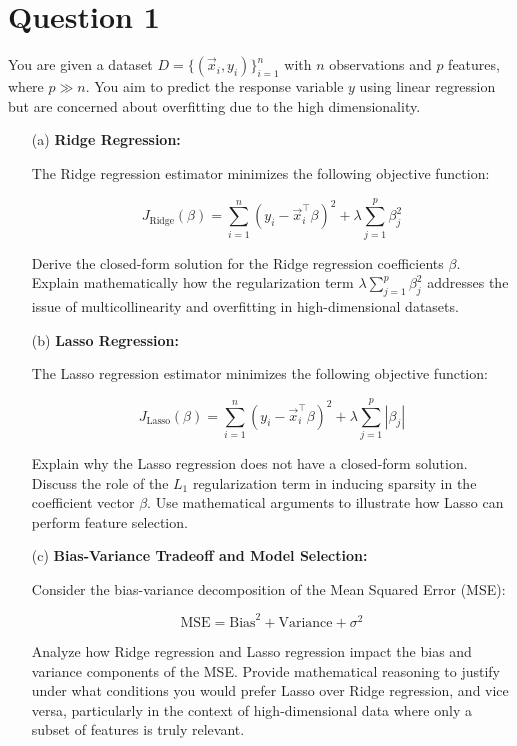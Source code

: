 \documentclass{article}
\begin{document}
\section*{Question 1}

You are given a dataset \( D = \{ (\vec{x}_i, y_i) \}_{i=1}^n \) with \( n \) observations and \( p \) features, where \( p \gg n \). You aim to predict the response variable \( y \) using linear regression but are concerned about overfitting due to the high dimensionality.

\begin{enumerate}
    \item[(a)] \textbf{Ridge Regression:}
    
    The Ridge regression estimator minimizes the following objective function:
    
    \[
    J_{\text{Ridge}}(\beta) = \sum_{i=1}^n (y_i - \vec{x}_i^\top \beta)^2 + \lambda \sum_{j=1}^p \beta_j^2
    \]
    
    Derive the closed-form solution for the Ridge regression coefficients \( \beta \). Explain mathematically how the regularization term \( \lambda \sum_{j=1}^p \beta_j^2 \) addresses the issue of multicollinearity and overfitting in high-dimensional datasets.
    
    \item[(b)] \textbf{Lasso Regression:}
    
    The Lasso regression estimator minimizes the following objective function:
    
    \[
    J_{\text{Lasso}}(\beta) = \sum_{i=1}^n (y_i - \vec{x}_i^\top \beta)^2 + \lambda \sum_{j=1}^p |\beta_j|
    \]
    
    Explain why the Lasso regression does not have a closed-form solution. Discuss the role of the \( L_1 \) regularization term in inducing sparsity in the coefficient vector \( \beta \). Use mathematical arguments to illustrate how Lasso can perform feature selection.
    
    \item[(c)] \textbf{Bias-Variance Tradeoff and Model Selection:}
    
    Consider the bias-variance decomposition of the Mean Squared Error (MSE):
    
    \[
    \text{MSE} = \text{Bias}^2 + \text{Variance} + \sigma^2
    \]
    
    Analyze how Ridge regression and Lasso regression impact the bias and variance components of the MSE. Provide mathematical reasoning to justify under what conditions you would prefer Lasso over Ridge regression, and vice versa, particularly in the context of high-dimensional data where only a subset of features is truly relevant.
\end{enumerate}
\end{document}
